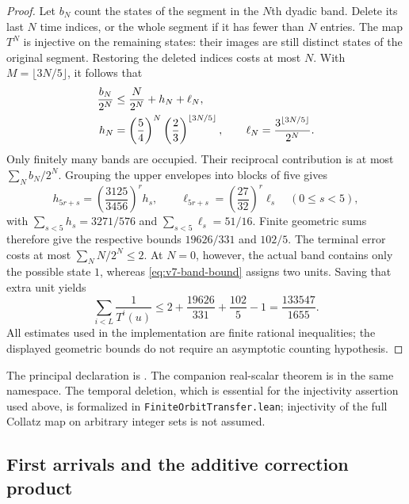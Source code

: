 \begin{proof}
Let $b_N$ count the states of the segment in the $N$th dyadic band.
Delete its last $N$ time indices, or the whole segment if it has fewer
than $N$ entries. The map $T^N$ is injective on the remaining states:
their images are still distinct states of the original segment.
Restoring the deleted indices costs at most $N$. With
$M=\lfloor3N/5\rfloor$, it follows that
\begin{align}
 \frac{b_N}{2^N}&\le\frac{N}{2^N}+h_N+\ell_N,
 \label{eq:v7-band-bound}\\
 h_N&=\left(\frac54\right)^N\left(\frac23\right)^{\lfloor3N/5\rfloor},
 \qquad \ell_N=\frac{3^{\lfloor3N/5\rfloor}}{2^N}.\notag
\end{align}
Only finitely many bands are occupied. Their reciprocal contribution is
at most $\sum_N b_N/2^N$. Grouping the upper envelopes into blocks of
five gives
\[
 h_{5r+s}=\left(\frac{3125}{3456}\right)^r h_s,
 \qquad
 \ell_{5r+s}=\left(\frac{27}{32}\right)^r\ell_s
 \quad(0\le s<5),
\]
with $\sum_{s<5}h_s=3271/576$ and
$\sum_{s<5}\ell_s=51/16$. Finite geometric sums therefore give the
respective bounds $19626/331$ and $102/5$. The terminal error costs at
most $\sum_N N/2^N\le2$. At $N=0$, however, the actual band contains
only the possible state $1$, whereas \eqref{eq:v7-band-bound} assigns
two units. Saving that extra unit yields
\[
 \sum_{i<L}\frac1{T^i(u)}
 \le 2+\frac{19626}{331}+\frac{102}{5}-1
 =\frac{133547}{1655}.
\]
All estimates used in the implementation are finite rational inequalities;
the displayed geometric bounds do not require an asymptotic counting
hypothesis.
\end{proof}

The principal declaration is
.
The companion real-scalar theorem is
in the same namespace. The temporal deletion, which is essential for the
injectivity assertion used above, is formalized in
\texttt{FiniteOrbitTransfer.lean}; injectivity of the full Collatz map on
arbitrary integer sets is not assumed.

\subsection{First arrivals and the additive correction product}

